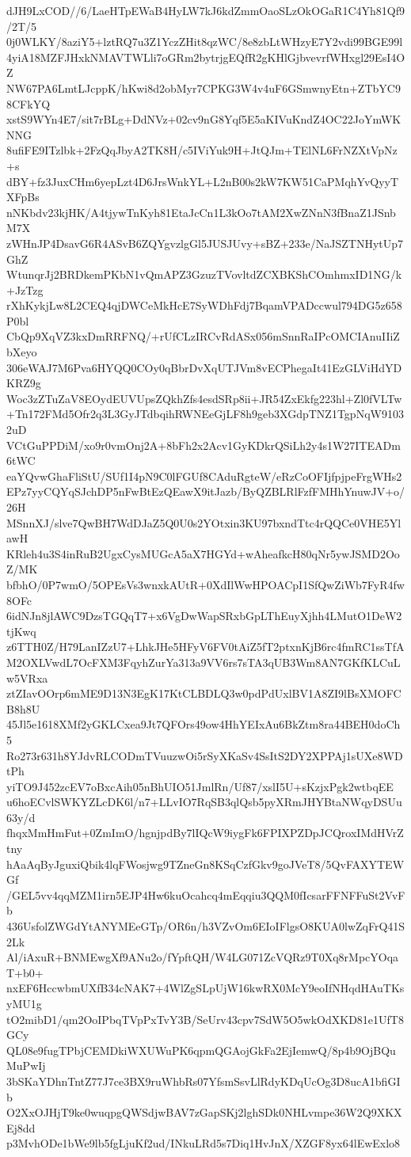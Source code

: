dJH9LxCOD//6/LaeHTpEWaB4HyLW7kJ6kdZmmOaoSLzOkOGaR1C4Yh81Qf9/2T/5
0j0WLKY/8aziY5+lztRQ7u3Z1YczZHit8qzWC/8e8zbLtWHzyE7Y2vdi99BGE99l
4yiA18MZFJHxkNMAVTWLli7oGRm2bytrjgEQfR2gKHlGjbvevrfWHxgl29EsI4OZ
NW67PA6LmtLJcppK/hKwi8d2obMyr7CPKG3W4v4uF6GSmwnyEtn+ZTbYC98CFkYQ
xstS9WYn4E7/sit7rBLg+DdNVz+02cv9nG8Yqf5E5aKIVuKndZ4OC22JoYmWKNNG
8ufiFE9ITzlbk+2FzQqJbyA2TK8H/c5IViYuk9H+JtQJm+TElNL6FrNZXtVpNz+s
dBY+fz3JuxCHm6yepLzt4D6JrsWnkYL+L2nB00s2kW7KW51CaPMqhYvQyyTXFpBs
nNKbdv23kjHK/A4tjywTnKyh81EtaJcCn1L3kOo7tAM2XwZNnN3fBnaZ1JSnbM7X
zWHnJP4DsavG6R4ASvB6ZQYgvzlgGl5JUSJUvy+sBZ+233e/NaJSZTNHytUp7GhZ
WtunqrJj2BRDkemPKbN1vQmAPZ3GzuzTVovltdZCXBKShCOmhmxID1NG/k+JzTzg
rXhKykjLw8L2CEQ4qjDWCeMkHcE7SyWDhFdj7BqamVPADccwul794DG5z658P0bl
CbQp9XqVZ3kxDmRRFNQ/+rUfCLzIRCvRdASx056mSnnRaIPcOMCIAnuIIiZbXeyo
306eWAJ7M6Pva6HYQQ0COy0qBbrDvXqUTJVm8vECPhegaIt41EzGLViHdYDKRZ9g
Woc3zZTuZaV8EOydEUVUpsZQkhZfs4esdSRp8ii+JR54ZxEkfg223hl+Zl0fVLTw
+Tn172FMd5Ofr2q3L3GyJTdbqihRWNEeGjLF8h9geb3XGdpTNZ1TgpNqW91032uD
VCtGuPPDiM/xo9r0vmOnj2A+8bFh2x2Acv1GyKDkrQSiLh2y4s1W27ITEADm6tWC
eaYQvwGhaFliStU/SUf1I4pN9C0lFGUf8CAduRgteW/eRzCoOFIjfpjpeFrgWHs2
EPz7yyCQYqSJchDP5nFwBtEzQEawX9itJazb/ByQZBLRlFzfFMHhYnuwJV+o/26H
MSnnXJ/slve7QwBH7WdDJaZ5Q0U0s2YOtxin3KU97bxndTtc4rQQCe0VHE5YlawH
KRleh4u3S4inRuB2UgxCysMUGcA5aX7HGYd+wAheafkcH80qNr5ywJSMD2OoZ/MK
bfbhO/0P7wmO/5OPEsVs3wnxkAUtR+0XdIlWwHPOACpI1SfQwZiWb7FyR4fw8OFc
6idNJn8jlAWC9DzsTGQqT7+x6VgDwWapSRxbGpLThEuyXjhh4LMutO1DeW2tjKwq
z6TTH0Z/H79LanIZzU7+LhkJHe5HFyV6FV0tAiZ5fT2ptxnKjB6rc4fmRC1ssTfA
M2OXLVwdL7OcFXM3FqyhZurYa313a9VV6rs7sTA3qUB3Wm8AN7GKfKLCuLw5VRxa
ztZIavOOrp6mME9D13N3EgK17KtCLBDLQ3w0pdPdUxlBV1A8ZI9lBsXMOFCB8h8U
45Jl5e1618XMf2yGKLCxea9Jt7QFOrs49ow4HhYEIxAu6BkZtm8ra44BEH0doCh5
Ro273r631h8YJdvRLCODmTVuuzwOi5rSyXKaSv4SsItS2DY2XPPAj1sUXe8WDtPh
yiTO9J452zcEV7oBxcAih05nBhUIO51JmlRn/Uf87/xslI5U+sKzjxPgk2wtbqEE
u6hoECvlSWKYZLcDK6l/n7+LLvIO7RqSB3qlQsb5pyXRmJHYBtaNWqyDSUu63y/d
fhqxMmHmFut+0ZmImO/hgnjpdBy7lIQcW9iygFk6FPIXPZDpJCQroxIMdHVrZtny
hAaAqByJguxiQbik4lqFWosjwg9TZneGn8KSqCzfGkv9goJVeT8/5QvFAXYTEWGf
/GEL5vv4qqMZM1irn5EJP4Hw6kuOcahcq4mEqqiu3QQM0fIcsarFFNFFuSt2VvFb
436UsfolZWGdYtANYMEeGTp/OR6n/h3VZvOm6EIoIFlgsO8KUA0lwZqFrQ41S2Lk
Al/iAxuR+BNMEwgXf9ANu2o/fYpftQH/W4LG071ZcVQRz9T0Xq8rMpcYOqaT+b0+
nxEF6HccwbmUXfB34cNAK7+4WlZgSLpUjW16kwRX0McY9eoIfNHqdHAuTKsyMU1g
tO2mibD1/qm2OoIPbqTVpPxTvY3B/SeUrv43cpv7SdW5O5wkOdXKD81e1UfT8GCy
QL08e9fugTPbjCEMDkiWXUWuPK6qpmQGAojGkFa2EjIemwQ/8p4b9OjBQuMuPwIj
3bSKaYDhnTntZ77J7ce3BX9ruWhbRs07YfsmSsvLlRdyKDqUcOg3D8ucA1bfiGIb
O2XxOJHjT9ke0wuqpgQWSdjwBAV7zGapSKj2lghSDk0NHLvmpe36W2Q9XKXEj8dd
p3MvhODe1bWe9lb5fgLjuKf2ud/INkuLRd5s7Diq1HvJnX/XZGF8yx64lEwExlo8

